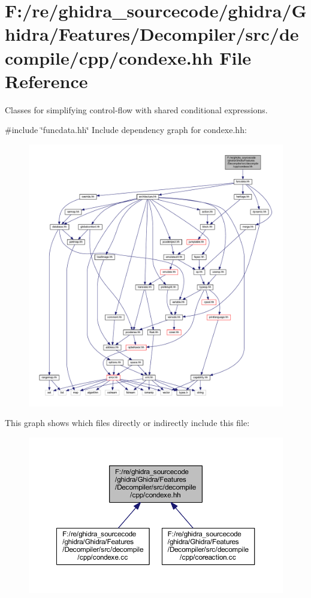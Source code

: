 \hypertarget{condexe_8hh}{}\section{F\+:/re/ghidra\+\_\+sourcecode/ghidra/\+Ghidra/\+Features/\+Decompiler/src/decompile/cpp/condexe.hh File Reference}
\label{condexe_8hh}


Classes for simplifying control-\/flow with shared conditional expressions.  


{\ttfamily \#include \char`\"{}funcdata.\+hh\char`\"{}}\newline
Include dependency graph for condexe.\+hh\+:
\nopagebreak
\begin{figure}[H]
\begin{center}
\leavevmode
\includegraphics[width=350pt]{condexe_8hh__incl}
\end{center}
\end{figure}
This graph shows which files directly or indirectly include this file\+:
\nopagebreak
\begin{figure}[H]
\begin{center}
\leavevmode
\includegraphics[width=350pt]{condexe_8hh__dep__incl}
\end{center}
\end{figure}

